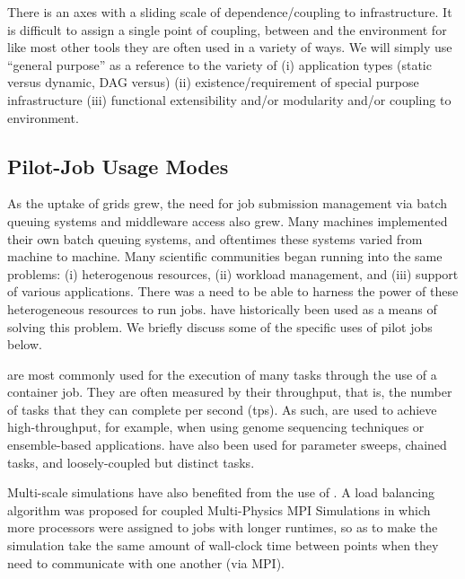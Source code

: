 \documentclass{sig-alternate}
\begin{document}

There is an axes with a sliding scale of dependence/coupling to
infrastructure.  It is difficult to assign a single point of coupling,
between \pilotjobs and the environment for like most other tools they
are often used in a variety of ways.  We will simply use ``general
purpose'' as a reference to the variety of (i) application types
(static versus dynamic, DAG versus) (ii) existence/requirement of
special purpose infrastructure (iii) functional extensibility and/or
modularity and/or coupling to environment.

\subsection{Pilot-Job Usage Modes}

As the uptake of grids grew, the need for job submission management
via batch queuing systems and middleware access also grew. Many
machines implemented their own batch queuing systems, and oftentimes
these systems varied from machine to machine. Many scientific
communities began running into the same problems: (i) heterogenous
resources, (ii) workload management, and (iii) support of various
applications. There was a need to be able to
harness the power of these heterogeneous resources to run
jobs. \pilotjobs have historically been used as a means of solving
this problem. We briefly discuss some of the specific uses of pilot 
jobs below.

\pilotjobs are most commonly used for the execution of many tasks
through the use of a container job. They are often measured by
their throughput, that is, the number of tasks that they can complete
per second (tps). As such, \pilotjobs are used to achieve
high-throughput, for example, when using genome sequencing techniques
or ensemble-based applications. \pilotjobs have also been used for
parameter sweeps, chained tasks, and loosely-coupled but distinct
tasks. %

Multi-scale simulations have also benefited from the use of
\pilotjobs. A \pilotjob load balancing algorithm was proposed for
coupled Multi-Physics MPI Simulations \cite{ko-efficient} in which
more processors were assigned to jobs with longer runtimes, so as to
make the simulation take the same amount of wall-clock time between
points when they need to communicate with one another (via MPI).
\end{document}
